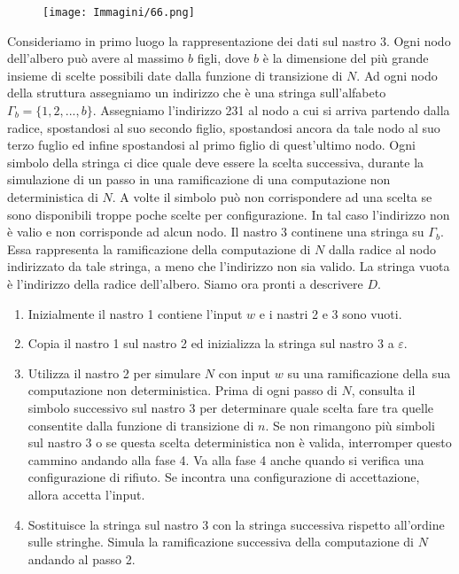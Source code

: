 \documentclass{article}
\begin{document}
\begin{figure}[H]
    \centering
    \texttt{[image: Immagini/66.png]}
    \label{fig:turing_machine_example2}
\end{figure}

Consideriamo in primo luogo la rappresentazione dei dati sul nastro 3.
Ogni nodo dell'albero può avere al massimo $b$ figli, dove $b$ è la dimensione del più grande insieme di scelte possibili date dalla funzione di transizione di $N$.
Ad ogni nodo della struttura assegniamo un indirizzo che è una stringa sull'alfabeto $\Gamma_b = \{1,2,...,b\}$.
Assegniamo l'indirizzo 231 al nodo a cui si arriva partendo dalla radice, spostandosi al suo secondo figlio, spostandosi ancora da tale nodo al suo terzo fuglio ed infine spostandosi al primo figlio di quest'ultimo nodo.
Ogni simbolo della stringa ci dice quale deve essere la scelta successiva, durante la simulazione di un passo in una ramificazione di una computazione non deterministica di $N$.
A volte il simbolo può non corrispondere ad una scelta se sono disponibili troppe poche scelte per configurazione.
In tal caso l'indirizzo non è valio e non corrisponde ad alcun nodo.
Il nastro 3 continene una stringa su $\Gamma_b$.
Essa rappresenta la ramificazione della computazione di $N$ dalla radice al nodo indirizzato da tale stringa, a meno che l'indirizzo non sia valido.
La stringa vuota è l'indirizzo della radice dell'albero.
Siamo ora pronti a descrivere $D$.
\begin{enumerate}
    \item Inizialmente il nastro 1 contiene l'input $w$ e i nastri 2 e 3 sono vuoti.
    \item Copia il nastro 1 sul nastro 2 ed inizializza la stringa sul nastro 3 a $\varepsilon$.
    \item Utilizza il nastro 2 per simulare $N$ con input $w$ su una ramificazione della sua computazione non deterministica. Prima di ogni passo di $N$, consulta il simbolo successivo sul nastro 3 per determinare quale scelta fare tra quelle consentite dalla funzione di transizione di $n$. Se non rimangono più simboli sul nastro 3 o se questa scelta deterministica non è valida, interromper questo cammino andando alla fase 4. Va alla fase 4 anche quando si verifica una configurazione di rifiuto. Se incontra una configurazione di accettazione, allora accetta l'input.
    \item Sostituisce la stringa sul nastro 3 con la stringa successiva rispetto all'ordine sulle stringhe. Simula la ramificazione successiva della computazione di $N$ andando al passo 2.
\end{enumerate}
\end{document}
